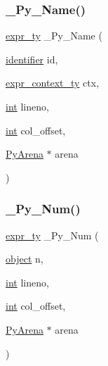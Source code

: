 \subsubsection{\texorpdfstring{\_Py\_Name()}{\_Py\_Name()}}
{\footnotesize\ttfamily \mbox{\hyperlink{_python-ast_8h_a56d3705e020a071405094a220c4592bd}{expr\+\_\+ty}} \+\_\+\+Py\+\_\+\+Name (\begin{DoxyParamCaption}\item[{\mbox{\hyperlink{asdl_8h_a78ca2081e230a95abc88c411c9816775}{identifier}}}]{id,  }\item[{\mbox{\hyperlink{_python-ast_8h_a38710ce394ed6d5cc8ebe79a322dcdf9}{expr\+\_\+context\+\_\+ty}}}]{ctx,  }\item[{\mbox{\hyperlink{warnings_8h_a74f207b5aa4ba51c3a2ad59b219a423b}{int}}}]{lineno,  }\item[{\mbox{\hyperlink{warnings_8h_a74f207b5aa4ba51c3a2ad59b219a423b}{int}}}]{col\+\_\+offset,  }\item[{\mbox{\hyperlink{pyarena_8h_a9edeb357fbb27333471022a0975adb7a}{Py\+Arena}} $\ast$}]{arena }\end{DoxyParamCaption})}

\mbox{\label{_python-ast_8h_a79a9fac1cfaeeff22b78665840bca615}} 
\subsubsection{\texorpdfstring{\_Py\_Num()}{\_Py\_Num()}}
{\footnotesize\ttfamily \mbox{\hyperlink{_python-ast_8h_a56d3705e020a071405094a220c4592bd}{expr\+\_\+ty}} \+\_\+\+Py\+\_\+\+Num (\begin{DoxyParamCaption}\item[{\mbox{\hyperlink{classobject}{object}}}]{n,  }\item[{\mbox{\hyperlink{warnings_8h_a74f207b5aa4ba51c3a2ad59b219a423b}{int}}}]{lineno,  }\item[{\mbox{\hyperlink{warnings_8h_a74f207b5aa4ba51c3a2ad59b219a423b}{int}}}]{col\+\_\+offset,  }\item[{\mbox{\hyperlink{pyarena_8h_a9edeb357fbb27333471022a0975adb7a}{Py\+Arena}} $\ast$}]{arena }\end{DoxyParamCaption})}

\mbox{\label{_python-ast_8h_afa9885f0b471f7e1a640ac82c9be090f}} 
